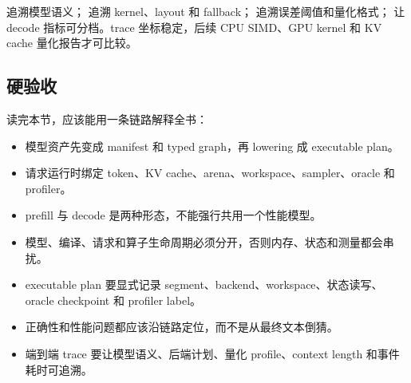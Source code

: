  追溯模型语义； 追溯 kernel、layout 和 fallback； 追溯误差阈值和量化格式； 让 decode 指标可分档。trace 坐标稳定，后续 CPU SIMD、GPU kernel 和 KV cache 量化报告才可比较。

\subsection{硬验收}

读完本节，应该能用一条链路解释全书：

\begin{itemize}
  \item 模型资产先变成 manifest 和 typed graph，再 lowering 成 executable plan。
  \item 请求运行时绑定 token、KV cache、arena、workspace、sampler、oracle 和 profiler。
  \item prefill 与 decode 是两种形态，不能强行共用一个性能模型。
  \item 模型、编译、请求和算子生命周期必须分开，否则内存、状态和测量都会串扰。
  \item executable plan 要显式记录 segment、backend、workspace、状态读写、oracle checkpoint 和 profiler label。
  \item 正确性和性能问题都应该沿链路定位，而不是从最终文本倒猜。
  \item 端到端 trace 要让模型语义、后端计划、量化 profile、context length 和事件耗时可追溯。
\end{itemize}
